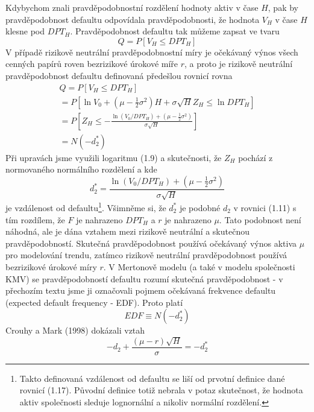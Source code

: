 Kdybychom znali pravděpodobnostní rozdělení hodnoty aktiv v čase $H$, pak by pravděpodobnost defaultu odpovídala pravděpodobnosti, že hodnota $V_H$ v čase $H$ klesne pod $DPT_H$. Pravděpodobnost defaultu tak můžeme zapsat ve tvaru
\begin{equation}
Q = P[V_H \le DPT_H]
\end{equation}
V případě rizikově neutrální pravděpodobnostní míry je očekávaný výnos všech cenných papírů roven bezrizikové úrokové míře $r$, a proto je rizikově neutrální pravděpodobnost defaultu definovaná předešlou rovnicí rovna
\begin{multline}
Q = P[V_H \le DPT_H]\\
= P\left[\ln V_0 + \left(\mu - \frac{1}{2}\sigma^2 \right)H + \sigma \sqrt{H}Z_H \le \ln DPT_H \right]\\
= P \left[Z_H \le - \frac{\ln(V_0 / DPT_H) + \left(\mu - \frac{1}{2}\sigma^2\right)}{\sigma \sqrt{H}}\right]\\
= N(-d_2^*)
\end{multline}
Při upravách jsme využili logaritmu (1.9) a skutečnosti, že $Z_H$ pochází z normovaného normálního rozdělení a kde
\begin{equation}
d_2^* = \frac{\ln(V_0 / DPT_H) + \left(\mu - \frac{1}{2}\sigma^2\right)}{\sigma \sqrt{H}}
\end{equation}
je vzdálenost od defaultu\footnote{Takto definovaná vzdálenost od defaultu se liší od prvotní definice dané rovnicí (1.17). Původní definice totiž nebrala v potaz skutečnost, že hodnota aktiv společnosti sleduje lognornální a nikoliv normální rozdělení.}. Všimněme si, že $d^*_2$ je podobné $d_2$ v rovnici (1.11) s tím rozdílem, že $F$ je nahrazeno $DPT_H$ a $r$ je nahrazeno $\mu$. Tato podobnost není náhodná, ale je dána vztahem mezi rizikově neutrální a skutečnou pravděpodobností. Skutečná pravděpodobnost používá očekávaný výnos aktiva $\mu$ pro modelování trendu, zatímco rizikově neutrální pravděpodobnost používá bezrizikové úrokové míry $r$. V Mertonově modelu (a  také v modelu společnosti KMV) se pravděpodobností defaultu rozumí skutečná pravděpodobnost - v přechozím textu jsme ji označovali pojmem očekávaná frekvence defaultu (expected default frequency - EDF). Proto platí
\begin{equation}
EDF \equiv N(-d_2^*)
\end{equation}
Crouhy a Mark (1998) dokázali vztah
\begin{equation}
-d_2 + \frac{(\mu - r)\sqrt{H}}{\sigma} = -d_2^*
\end{equation}
